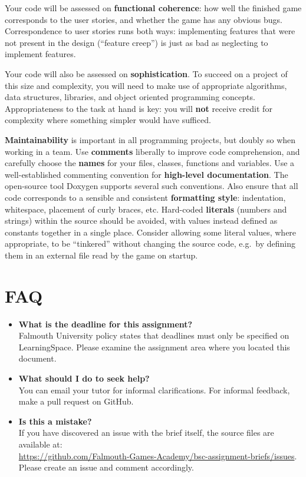 \documentclass{../fal_assignment}
\begin{document}
Your code will be assessed on \textbf{functional coherence}:
how well the finished game corresponds to the user stories,
and whether the game has any obvious bugs.
Correspondence to user stories runs both ways:
implementing features that were not present in the design (``feature creep'')
is just as bad as neglecting to implement features.

Your code will also be assessed on \textbf{sophistication}.
To succeed on a project of this size and complexity,
you will need to make use of appropriate algorithms, data structures, libraries, and object oriented programming concepts.
Appropriateness to the task at hand is key:
you will \textbf{not} receive credit for complexity  
where something simpler would have sufficed.

\textbf{Maintainability} is important in all programming projects,
but doubly so when working in a team.
Use \textbf{comments} liberally to improve code comprehension,
and carefully choose the \textbf{names} for your files, classes, functions and variables.
Use a well-established commenting convention
for \textbf{high-level documentation}.
The open-source tool Doxygen supports several such conventions.
Also ensure that all code corresponds to a sensible and consistent \textbf{formatting style}:
indentation, whitespace, placement of curly braces, etc.
Hard-coded \textbf{literals} (numbers and strings) within the source should be avoided,
with values instead defined as constants together in a single place.
Consider allowing some literal values, where appropriate, to be ``tinkered'' without changing the source code,
e.g.\ by defining them in an external file read by the game on startup.

\section*{FAQ}

\begin{itemize}
	\item 	\textbf{What is the deadline for this assignment?} \\ 
    		Falmouth University policy states that deadlines must only be specified on LearningSpace. Please examine the assignment area where you located this document.
    		
	\item 	\textbf{What should I do to seek help?} \\ 
    		You can email your tutor for informal clarifications. For informal feedback, make a pull request on GitHub. 
    		
    	\item 	\textbf{Is this a mistake?} \\ 	
    		If you have discovered an issue with the brief itself, the source files are available at: \\
    		\url{https://github.com/Falmouth-Games-Academy/bsc-assignment-briefs/issues}.\\
    		 Please create an issue and comment accordingly.
\end{itemize}
\end{document}
